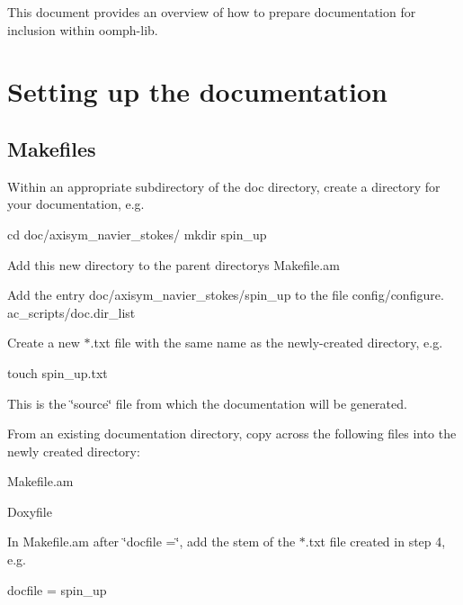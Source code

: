 This document provides an overview of how to prepare documentation for inclusion within {\ttfamily oomph-\/lib}.



 

\hypertarget{index_setup}{}\section{Setting up the documentation}\label{index_setup}
\hypertarget{index_makefiles}{}\subsection{Makefiles}\label{index_makefiles}

\begin{DoxyEnumerate}
\item Within an appropriate subdirectory of the {\ttfamily doc} directory, create a directory for your documentation, e.\+g. 
\begin{DoxyCode}
cd doc/axisym\_navier\_stokes/
mkdir spin\_up
\end{DoxyCode}

\item Add this new directory to the parent directory\textquotesingle{}s {\ttfamily Makefile.\+am} 
\item Add the entry {\ttfamily doc/axisym\+\_\+navier\+\_\+stokes/spin\+\_\+up} to the file {\ttfamily config/configure}. {\ttfamily ac\+\_\+scripts/doc}.{\ttfamily dir\+\_\+list} 
\item Create a new {\ttfamily $\ast$}.{\ttfamily txt} file with the same name as the newly-\/created directory, e.\+g. 
\begin{DoxyCode}
touch spin\_up.txt
\end{DoxyCode}
 This is the \char`\"{}source\char`\"{} file from which the documentation will be generated.
\item From an existing documentation directory, copy across the following files into the newly created directory\+:
\begin{DoxyItemize}
\item {\ttfamily Makefile.\+am} 
\item {\ttfamily Doxyfile} 
\end{DoxyItemize}
\item In {\ttfamily Makefile.\+am} after {\ttfamily \char`\"{}docfile =\char`\"{}}, add the stem of the {\ttfamily $\ast$}.{\ttfamily txt} file created in step 4, e.\+g. 
\begin{DoxyCode}
docfile = spin\_up
\end{DoxyCode}


\end{DoxyEnumerate}
